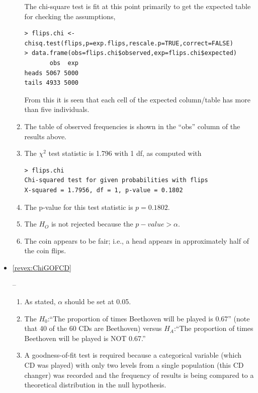 \documentclass[10pt,openany]{book}\usepackage[]{graphicx}\usepackage[]{color}
\makeatletter
\newenvironment{kframe}{%
 \def\at@end@of@kframe{}%
 \ifinner\ifhmode%
  \def\at@end@of@kframe{\end{minipage}}%
  \begin{minipage}{\columnwidth}%
 \fi\fi%
 \def\FrameCommand##1{\hskip\@totalleftmargin \hskip-\fboxsep
 \colorbox{shadecolor}{##1}\hskip-\fboxsep
     \hskip-\linewidth \hskip-\@totalleftmargin \hskip\columnwidth}%
 \MakeFramed {\advance\hsize-\width
   \@totalleftmargin\z@ \linewidth\hsize
   \@setminipage}}%
 {\par\unskip\endMakeFramed%
 \at@end@of@kframe}
\newenvironment{knitrout}{}{} %
\makeatother
\begin{document}
\begin{itemize}
\begin{enumerate}
\begin{knitrout}
\begin{kframe}
\end{kframe}
\end{knitrout}
The chi-square test is fit at this point primarily to get the expected table for checking the assumptions,
\begin{knitrout}
\color{fgcolor}\begin{kframe}
\begin{verbatim}
> flips.chi <- chisq.test(flips,p=exp.flips,rescale.p=TRUE,correct=FALSE)
> data.frame(obs=flips.chi$observed,exp=flips.chi$expected)
       obs  exp
heads 5067 5000
tails 4933 5000
\end{verbatim}
\end{kframe}
\end{knitrout}
From this it is seen that each cell of the expected column/table has more than five individuals.
      \item The table of observed frequencies is shown in the ``obs'' column of the results above.
      \item The $\chi^{2}$ test statistic is 1.796 with 1 df, as computed with
\begin{knitrout}
\color{fgcolor}\begin{kframe}
\begin{verbatim}
> flips.chi
Chi-squared test for given probabilities with flips 
X-squared = 1.7956, df = 1, p-value = 0.1802
\end{verbatim}
\end{kframe}
\end{knitrout}
      \item The p-value for this test statistic is $p=0.1802$.
      \item The $H_{O}$ is not rejected because the $p-value>\alpha$.
      \item The coin appears to be fair; i.e., a head appears in approximately half of the coin flips.
    \end{enumerate}
  \item \hypertarget{ans:ChiGOFCD}{\ref{revex:ChiGOFCD}} --
    \begin{enumerate}
      \item As stated, $\alpha$ should be set at 0.05.
      \item The $H_{0}$:``The proportion of times Beethoven will be played is 0.67'' (note that 40 of the 60 CDs are Beethoven) versus $H_{A}$:``The proportion of times Beethoven will be played is NOT 0.67.''
      \item A goodness-of-fit test is required because a categorical variable (which CD was played) with only two levels from a single population (this CD changer) was recorded and the frequency of results is being compared to a theoretical distribution in the null hypothesis.

\end{enumerate}
\end{itemize}
\end{document}
